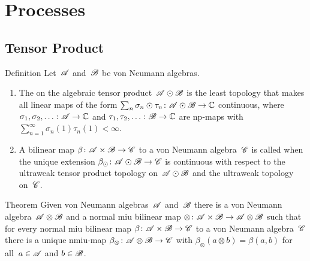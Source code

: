 \documentclass[a]{subfiles}
\begin{document}
\chapter{Processes}
\section{Tensor Product}
\begin{parsec}%
\begin{point}{Definition}%
Let~$\mathscr{A}$ and~$\mathscr{B}$ be von Neumann algebras.
\begin{enumerate}
\item
The 
on the algebraic tensor product~$\mathscr{A}\odot\mathscr{B}$
is the least topology that makes
all linear maps of the form $\sum_n \sigma_n \odot \tau_n
\colon \mathscr{A} \odot \mathscr{B}\to\mathbb{C}$
continuous,
where $\sigma_1,\sigma_2,\dotsc \colon \mathscr{A}\to \mathbb{C}$
and $\tau_1,\tau_2,\dotsc \colon \mathscr{B}\to \mathbb{C}$
are np-maps
with $\sum_{n=1}^\infty\sigma_n(1)\tau_n(1)< \infty$.
\item
A bilinear map $\beta\colon \mathscr{A}\times \mathscr{B}\to\mathscr{C}$
to a von Neumann algebra~$\mathscr{C}$
is called 
when the unique extension $\beta_\odot \colon \mathscr{A}\odot \mathscr{B}\to \mathscr{C}$
is continuous with respect to the ultraweak tensor product topology 
on~$\mathscr{A}\odot\mathscr{B}$
and the ultraweak topology on~$\mathscr{C}$.
\end{enumerate}
\end{point}
\begin{point}{Theorem}%
Given von Neumann algebras~$\mathscr{A}$ and~$\mathscr{B}$
there is a von Neumann algebra~$\mathscr{A}\otimes\mathscr{B}$
and a normal miu
bilinear map $\otimes \colon \mathscr{A}\times \mathscr{B}\to
\mathscr{A}\otimes \mathscr{B}$
such that for every 
normal miu bilinear map $\beta\colon \mathscr{A}\times \mathscr{B}\to\mathscr{C}$
to a von Neumann algebra~$\mathscr{C}$
there is a unique nmiu-map $\beta_\otimes\colon \mathscr{A}\otimes \mathscr{B}
\to \mathscr{C}$ with $\beta_\otimes(a\otimes b) = \beta(a,b)$
for all~$a\in \mathscr{A}$ and $b\in\mathscr{B}$.
\end{point}
\end{parsec}
\end{document}

